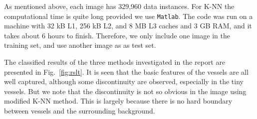 \documentclass[12pt, notitlepage]{article}
\newcommand{\fref}[1]{Fig.~\ref{#1}}
\begin{document}
As mentioned above, each image has 329,960 data instances.  For K-NN the computational time is quite long provided we use \verb|Matlab|.  The code was run on a machine with 32 kB L1, 256 kB L2, and 8 MB L3 caches and 3 GB RAM, and it takes about 6 hours to finish. Therefore, we only include one image in the training set, and use another image as as test set. 

The classified results of the three methods investigated in the report are presented in \fref{fig:rslt}. It is seen that the basic features of the vessels are all well captured, although some discontinuity are observed, especially in the tiny vessels. But we note that the discontinuity is not so obvious in the image using modified K-NN method. This is largely because there is no hard boundary between vessels and the surrounding background. 
 
\end{document}
